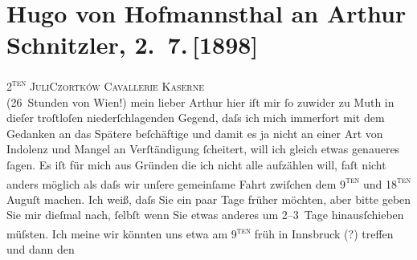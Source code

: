 

         \renewcommand{\erwaehnteOrte}{Orte: Basel, Innsbruck, Maloja, Schweiz, Tschortkiw, Wien}
         \renewcommand{\erwaehnteWerke}{}
               \section[Hugo von Hofmannsthal an Arthur Schnitzler, 2. 7. {[}1898{]}]{ Hugo von Hofmannsthal an Arthur Schnitzler, 2. 7. {[}1898{]}}\nopagebreak{}\rehead{ }\begin{ledgroupsized}[t]{13cm}\normalsize\beginnumbering \toendnotes[C]{\smallbreak\pagebreak[2]} 
\pstart
           {\pb}\textsc{2\textsuperscript{ten} Juli}\hfill \textsc{Czortków}\pend
           \pstart
           \raggedleft{}\textsc{Cavallerie Kaserne}{\\} (26 Stunden von Wien!)\pend
           \pstart{}mein lieber Arthur\pend\pstart
           hier iſt mir ſo zuwider zu Muth in dieſer troſtloſen niederſchlagenden Gegend, daſs
               ich mich immerfort mit dem Gedanken an das Spätere beſchäftige und damit es ja nicht
               an einer Art von Indolenz und Mangel an Verſtändigung ſcheitert, will ich gleich
               etwas genaueres ſagen. Es iſt {\pb}für
               mich aus Gründen die ich nicht alle aufzählen will, faſt nicht anders möglich als
               daſs wir unſere gemeinſame Fahrt zwiſchen dem 9\textsc{\textsuperscript{ten}} und 18\textsc{\textsuperscript{ten}} Auguſt machen. Ich weiß, daſs Sie ein paar Tage früher möchten, aber
               bitte geben Sie mir dieſmal {\pb}nach,
               ſelbſt wenn Sie etwas anderes um 2–3 Tage hinausſchieben müſsten. Ich meine wir
               könnten uns etwa am 9\textsc{\textsuperscript{ten}} früh in Innsbruck (?) treffen und dann den

\end{ledgroupsized}
